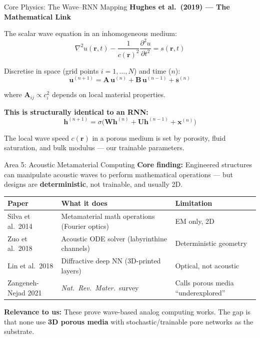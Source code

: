 \documentclass[aspectratio=169,11pt]{beamer}
\begin{document}
\begin{frame}{Core Physics: The Wave--RNN Mapping}
  \textbf{Hughes et al.\ (2019) --- The Mathematical Link}
  \vspace{0.2cm}

  The scalar wave equation in an inhomogeneous medium:
  \[
    \nabla^2 u(\mathbf{r},t) - \frac{1}{c(\mathbf{r})^2}\frac{\partial^2 u}{\partial t^2} = s(\mathbf{r},t)
  \]

  Discretise in space (grid points $i = 1,\dots,N$) and time ($n$):
  \[
    \mathbf{u}^{(n+1)} = \mathbf{A}\,\mathbf{u}^{(n)} + \mathbf{B}\,\mathbf{u}^{(n-1)} + \mathbf{s}^{(n)}
  \]

  where $\mathbf{A}_{ij} \propto c_i^2$ depends on local material properties.

  \vspace{0.2cm}
  \textbf{This is structurally identical to an RNN:}
  \[
    \mathbf{h}^{(n+1)} = \sigma\bigl(\mathbf{W}\mathbf{h}^{(n)} + \mathbf{U}\mathbf{h}^{(n-1)} + \mathbf{x}^{(n)}\bigr)
  \]

  \textcolor{gdpDarkBlue}{\small The local wave speed $c(\mathbf{r})$ in a porous medium is set by porosity, fluid saturation, and bulk modulus --- our trainable parameters.}
\end{frame}

\begin{frame}{Area 5: Acoustic Metamaterial Computing}
  \textbf{Core finding:} Engineered structures can manipulate acoustic waves to perform mathematical operations --- but designs are \textbf{deterministic}, not trainable, and usually 2D.

  \vspace{0.15cm}
  \begin{table}
    \centering
    \footnotesize
    \renewcommand{\arraystretch}{1.05}
    \begin{tabular}{@{}>{\raggedright}p{2.8cm}>{\raggedright}p{5.2cm}>{\raggedright\arraybackslash}p{4cm}@{}}
      \toprule
      \textbf{Paper} & \textbf{What it does} & \textbf{Limitation} \\
      \midrule
      Silva et al.\ 2014 & Metamaterial math operations (Fourier optics) & EM only, 2D \\
      Zuo et al.\ 2018 & Acoustic ODE solver (labyrinthine channels) & Deterministic geometry \\
      Lin et al.\ 2018 & Diffractive deep NN (3D-printed layers) & Optical, not acoustic \\
      Zangeneh-Nejad 2021 & \textit{Nat.\ Rev.\ Mater.}\ survey & Calls porous media ``underexplored'' \\
      \bottomrule
    \end{tabular}
  \end{table}

  {\footnotesize \textbf{Relevance to us:} These prove wave-based analog computing works. The gap is that none use \textbf{3D porous media} with stochastic/trainable pore networks as the substrate.}
\end{frame}
\end{document}
